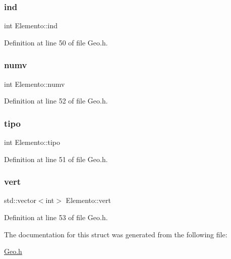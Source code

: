\subsubsection{\texorpdfstring{ind}{ind}}
{\footnotesize\ttfamily int Elemento\+::ind}



Definition at line 50 of file Geo.\+h.

\mbox{\label{structElemento_a34b767c0ea5585cf587648b1cf1a5909}} 
\subsubsection{\texorpdfstring{numv}{numv}}
{\footnotesize\ttfamily int Elemento\+::numv}



Definition at line 52 of file Geo.\+h.

\mbox{\label{structElemento_a46319a39b4dec556841a201eeed7266a}} 
\subsubsection{\texorpdfstring{tipo}{tipo}}
{\footnotesize\ttfamily int Elemento\+::tipo}



Definition at line 51 of file Geo.\+h.

\mbox{\label{structElemento_a49a35fa3d1cb067a942e2f6021c679c9}} 
\subsubsection{\texorpdfstring{vert}{vert}}
{\footnotesize\ttfamily std\+::vector$<$int$>$ Elemento\+::vert}



Definition at line 53 of file Geo.\+h.



The documentation for this struct was generated from the following file\+:\begin{DoxyCompactItemize}
\item 
\hyperlink{Geo_8h}{Geo.\+h}\end{DoxyCompactItemize}
